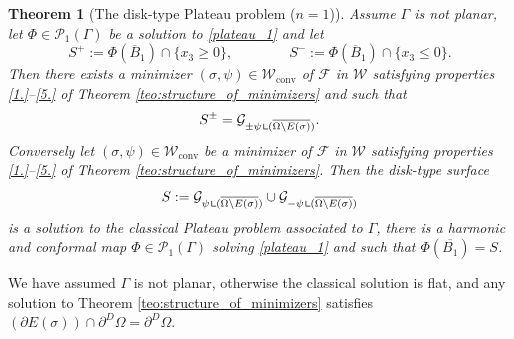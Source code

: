 \documentclass[JEP,XML,SOM,Unicode, NoFloatCountersInSection,published]{cedram}
\let\Om\Omega
\newcommand\admclassconv{{\mathcal W_\mathrm{conv}}}
\newcommand{\resa}{\mathop{\hbox{\vrule height 7pt width 0.5pt depth 0pt
\vrule height 0.5pt width 6pt depth 0pt}}\nolimits}
\newcommand{\resb}{\mathop{\hbox{\vrule height 4pt width 0.5pt depth 0pt
\vrule height 0.5pt width 3pt depth 0pt}}\nolimits}
\newcommand{\res}{\mathchoice{\resa}{\resa}{\resb}{\resb}}
\newtheorem{theorem}{Theorem}[section]
\theoremstyle{definition}
\begin{document}
\begin{theorem}[The disk-type Plateau problem ($n=1$)]
\label{teo:the_disk_type_Plateau_problem_n=1}
Assume $\Gamma$ is not planar, let $\Phi\in\mathcal{P}_1(\Gamma)$ be a solution to \eqref{plateau_1} and let
\[
S^+:=\Phi(\overline B_1)\cap \{x_3\ge0\},
\qquad \qquad S^-:=\Phi(\overline B_1)\cap \{x_3\le0\}.
\]
Then there exists a minimizer $(\sigma,\psi)\in \admclassconv$ of $\mathcal F$ in
$\mathcal W$
satisfying properties \ref{1.}--\ref{5.} of Theorem \ref{teo:structure_of_minimizers} and such that
\begin{equation}\label{eq:graph}
S^{\pm}=\mathcal G_{\pm\psi\res (\overline{\Om\setminus E(\sigma)})}.
\end{equation}
Conversely let $(\sigma,\psi)\in \admclassconv$ be a minimizer of $\mathcal F$ in $\mathcal W$ satisfying properties \ref{1.}--\ref{5.} of Theorem \ref{teo:structure_of_minimizers}. Then the disk-type surface
\[
S:=\mathcal G_{\psi\res (\overline{\Om\setminus E(\sigma)})}\cup\mathcal G_{-\psi\res (\overline{\Om\setminus E(\sigma)})}
\]
is a solution to the classical Plateau problem associated to $\Gamma$, \ie there is a harmonic and conformal map $\Phi\in\mathcal{P}_1(\Gamma)$
solving \eqref{plateau_1} and such that $\Phi(\overline{B_1})=S$.
\end{theorem}
{ We have assumed $\Gamma$ is not planar, otherwise the classical solution is flat, and any solution to Theorem \ref{teo:structure_of_minimizers} satisfies $(\partial E(\sigma))\cap \partial^D\Om=\partial^D\Om$.}
\end{document}
